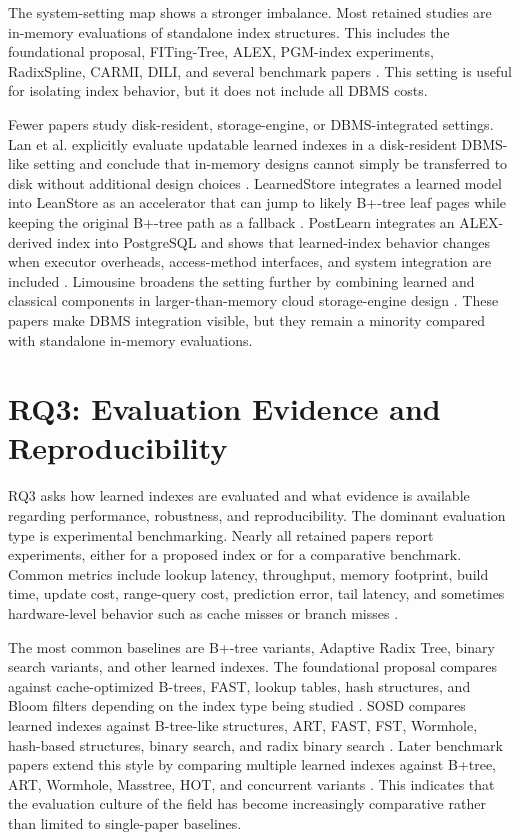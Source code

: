 \documentclass[a4paper, 12pt, twoside]{report}
\begin{document}
The system-setting map shows a stronger imbalance. Most retained studies are in-memory evaluations of standalone index structures. This includes the foundational proposal, FITing-Tree, ALEX, PGM-index experiments, RadixSpline, CARMI, DILI, and several benchmark papers \cite{kraska2018,galakatos2019fiting,ding2020alex,ferragina2020pgm,kipf2020radixspline,zhang2022carmi,li2023dili,marcus2020benchmarking,sun2023learned}. This setting is useful for isolating index behavior, but it does not include all DBMS costs.

Fewer papers study disk-resident, storage-engine, or DBMS-integrated settings. Lan et al. explicitly evaluate updatable learned indexes in a disk-resident DBMS-like setting and conclude that in-memory designs cannot simply be transferred to disk without additional design choices \cite{lan2023disk}. LearnedStore integrates a learned model into LeanStore as an accelerator that can jump to likely B+-tree leaf pages while keeping the original B+-tree path as a fallback \cite{maharjan2023learnedstore}. PostLearn integrates an ALEX-derived index into PostgreSQL and shows that learned-index behavior changes when executor overheads, access-method interfaces, and system integration are included \cite{fuad2026postlearn}. Limousine broadens the setting further by combining learned and classical components in larger-than-memory cloud storage-engine design \cite{chatterjee2024limousine}. These papers make DBMS integration visible, but they remain a minority compared with standalone in-memory evaluations.

\section{RQ3: Evaluation Evidence and Reproducibility}

RQ3 asks how learned indexes are evaluated and what evidence is available regarding performance, robustness, and reproducibility. The dominant evaluation type is experimental benchmarking. Nearly all retained papers report experiments, either for a proposed index or for a comparative benchmark. Common metrics include lookup latency, throughput, memory footprint, build time, update cost, range-query cost, prediction error, tail latency, and sometimes hardware-level behavior such as cache misses or branch misses \cite{marcus2020benchmarking,sun2023learned,wongkham2022ready,lan2023disk,luo2025robustness}.

The most common baselines are B+-tree variants, Adaptive Radix Tree, binary search variants, and other learned indexes. The foundational proposal compares against cache-optimized B-trees, FAST, lookup tables, hash structures, and Bloom filters depending on the index type being studied \cite{kraska2018}. SOSD compares learned indexes against B-tree-like structures, ART, FAST, FST, Wormhole, hash-based structures, binary search, and radix binary search \cite{marcus2020benchmarking}. Later benchmark papers extend this style by comparing multiple learned indexes against B+tree, ART, Wormhole, Masstree, HOT, and concurrent variants \cite{wongkham2022ready,sun2023learned,luo2025robustness}. This indicates that the evaluation culture of the field has become increasingly comparative rather than limited to single-paper baselines.
\end{document}
